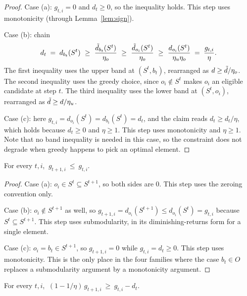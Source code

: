 \begin{proof}
Case (a): $g_{t,i} = 0$ and $d_{t} \ge 0$, so the inequality holds. This step
uses monotonicity (through Lemma~\ref{lem:sign}).

Case (b): chain
\begin{equation*}
d_{t} \;=\; d_{b_{t}}(S^{t})
\ \ge\ \frac{\tilde d_{b_{t}}(S^{t})}{\eta_{o}}
\ \ge\ \frac{\tilde d_{o_{i}}(S^{t})}{\eta_{o}}
\ \ge\ \frac{d_{o_{i}}(S^{t})}{\eta_{u} \eta_{o}}
\;=\; \frac{g_{t,i}}{\eta}.
\end{equation*}
The first inequality uses the upper band at $(S^{t}, b_{t})$, rearranged as
$d \ge \tilde d / \eta_{o}$. The second inequality uses the greedy choice, since
$o_{i} \notin S^{t}$ makes $o_{i}$ an eligible candidate at step $t$. The third
inequality uses the lower band at $(S^{t}, o_{i})$, rearranged as
$\tilde d \ge d / \eta_{u}$.

Case (c): here $g_{t,i} = d_{o_{i}}(S^{t}) = d_{b_{t}}(S^{t}) = d_{t}$, and the
claim reads $d_{t} \ge d_{t}/\eta$, which holds because $d_{t} \ge 0$ and
$\eta \ge 1$. This step uses monotonicity and $\eta \ge 1$. Note that no band
inequality is needed in this case, so the constraint does not degrade when
greedy happens to pick an optimal element.
\end{proof}

\begin{lemma}
\label{lem:mono}
For every $t, i$, $\ g_{t+1,i} \ \le\ g_{t,i}$.
\end{lemma}

\begin{proof}
Case (a): $o_{i} \in S^{t} \subseteq S^{t+1}$, so both sides are $0$. This step
uses the zeroing convention only.

Case (b): $o_{i} \notin S^{t+1}$ as well, so
$g_{t+1,i} = d_{o_{i}}(S^{t+1}) \le d_{o_{i}}(S^{t}) = g_{t,i}$ because
$S^{t} \subseteq S^{t+1}$. This step uses submodularity, in its
diminishing-returns form for a single element.

Case (c): $o_{i} = b_{t} \in S^{t+1}$, so $g_{t+1,i} = 0$ while
$g_{t,i} = d_{t} \ge 0$. This step uses monotonicity. This is the only place in
the four families where the case $b_{t} \in O$ replaces a submodularity argument
by a monotonicity argument.
\end{proof}

\begin{lemma}
\label{lem:cons}
For every $t, i$, $\ (1 - 1/\eta)\, g_{t+1,i} \ \ge\ g_{t,i} - d_{t}$.
\end{lemma}


